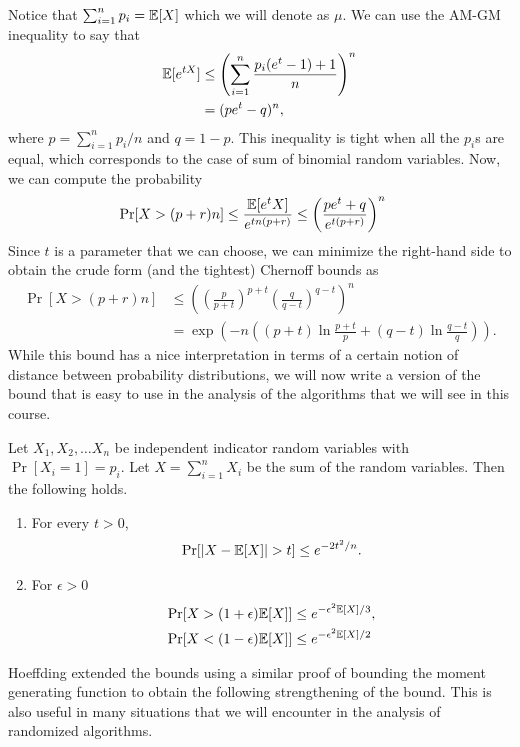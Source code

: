Notice that $\sum_{i=1}^n p_i = \mathbb{E}[X]$ which we will denote as $\mu$. We can use the AM-GM inequality to say that
\begin{align*}
	\mathbb{E}[e^{tX}] &\leq \left( \sum_{i=1}^n \frac{p_i(e^t-1)+1}{n} \right)^n\\
	&= (pe^t-q)^n,
\end{align*}
where $p = \sum_{i=1}^n p_i/n$ and $q = 1-p$. This inequality is tight when all the $p_i$s are equal, which corresponds to the case of sum of binomial random variables. Now, we can compute the probability 
\begin{align*}
	\Pr[X > (p+r)n] &\leq \frac{\mathbb{E}[e^tX]}{e^{tn(p+r)}} \leq \left( \frac{pe^t+q}{e^{t(p+r)}} \right)^n
\end{align*}
Since $t$ is a parameter that we can choose, we can minimize the right-hand side to obtain the crude form (and the tightest) Chernoff bounds as
\begin{align*}
	\Pr[X > (p+r)n] &\leq \left(\left( \frac{p}{p+t} \right)^{p+t} \left( \frac{q}{q-t} \right)^{q-t} \right)^n \\
	&= \exp\left( -n \left( (p+t)\ln \frac{p+t}{p} + (q-t)\ln \frac{q-t}{q} \right) \right).
\end{align*}
While this bound has a nice interpretation in terms of a certain notion of distance between probability distributions, we will now write a version of the bound that is easy to use in the analysis of the algorithms that we will see in this course.

\begin{theorem}
	Let $X_1, X_2, \ldots X_n$ be independent indicator random variables with $\Pr[X_i=1] = p_i$. Let $X = \sum_{i=1}^n X_i$ be the sum of the random variables. Then the following holds.
	\begin{enumerate}
		\item For every $t >0$,
		\begin{align*}
			\Pr[|X -\mathbb{E}[X]| > t] \leq e^{-2t^2/n}.
		\end{align*}
		\item For $\epsilon >0$
		\begin{align*}
			\Pr[X > (1+\epsilon)\mathbb{E}[X]] &\leq e^{-\epsilon^2\mathbb{E}[X]/3}, \\
			\Pr[X < (1-\epsilon)\mathbb{E}[X]] &\leq e^{-\epsilon^2\mathbb{E}[X]/2}
		\end{align*}
	\end{enumerate}
	\label{thm:chernoff}
\end{theorem}

Hoeffding extended the bounds using a similar proof of bounding the moment generating function to obtain the following strengthening of the bound. This is also useful in many situations that we will encounter in the analysis of randomized algorithms.


